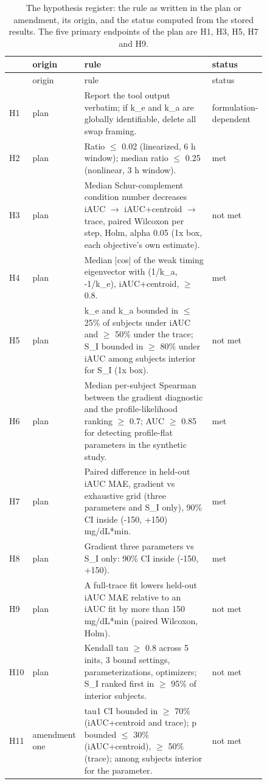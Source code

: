 {\footnotesize
\begin{longtable}{lp{0.16\linewidth}p{0.52\linewidth}p{0.16\linewidth}}
\caption{The hypothesis register: the rule as written in the plan or amendment, its origin, and the status computed from the stored results. The five primary endpoints of the plan are H1, H3, H5, H7 and H9.}\label{tab:register}\\
\toprule
& origin & rule & status \\
\midrule
\endfirsthead
\toprule
& origin & rule & status \\
\midrule
\endhead
H1 & plan & Report the tool output verbatim; if k\_e and k\_a are globally identifiable, delete all swap framing. & formulation-dependent \\
H2 & plan & Ratio $\le$ 0.02 (linearized, 6 h window); median ratio $\le$ 0.25 (nonlinear, 3 h window). & met \\
H3 & plan & Median Schur-complement condition number decreases iAUC $\to$ iAUC+centroid $\to$ trace, paired Wilcoxon per step, Holm, alpha 0.05 (1x box, each objective's own estimate). & not met \\
H4 & plan & Median |cos| of the weak timing eigenvector with (1/k\_a, -1/k\_e), iAUC+centroid, $\ge$ 0.8. & met \\
H5 & plan & k\_e and k\_a bounded in $\le$ 25\% of subjects under iAUC and $\ge$ 50\% under the trace; S\_I bounded in $\ge$ 80\% under iAUC among subjects interior for S\_I (1x box). & not met \\
H6 & plan & Median per-subject Spearman between the gradient diagnostic and the profile-likelihood ranking $\ge$ 0.7; AUC $\ge$ 0.85 for detecting profile-flat parameters in the synthetic study. & met \\
H7 & plan & Paired difference in held-out iAUC MAE, gradient vs exhaustive grid (three parameters and S\_I only), 90\% CI inside (-150, +150) mg/dL*min. & met \\
H8 & plan & Gradient three parameters vs S\_I only: 90\% CI inside (-150, +150). & met \\
H9 & plan & A full-trace fit lowers held-out iAUC MAE relative to an iAUC fit by more than 150 mg/dL*min (paired Wilcoxon, Holm). & not met \\
H10 & plan & Kendall tau $\ge$ 0.8 across 5 inits, 3 bound settings, parameterizations, optimizers; S\_I ranked first in $\ge$ 95\% of interior subjects. & not met \\
H11 & amendment one & tau1 CI bounded in $\ge$ 70\% (iAUC+centroid and trace); p bounded $\le$ 30\% (iAUC+centroid), $\ge$ 50\% (trace); among subjects interior for the parameter. & not met \\

\end{longtable}}
